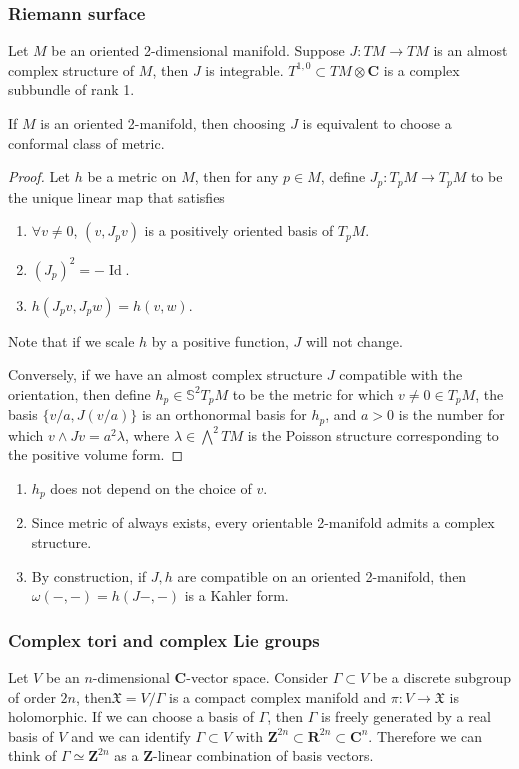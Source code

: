 \documentclass[
11pt, %
letterpaper， %
oneside, %
headinclude,footinclude, %
BCOR5mm, %
]{scrartcl}
\newcommand{\Z}{{\mathbf{Z}}}
\newcommand{\R}{{\mathbf{R}}}
\newcommand{\C}{{\mathbf{C}}}
\newcommand{\s}{{\mathbb{S}}}
\newcommand{\id}{\operatorname{Id}}
\begin{document}
\subsubsection{Riemann surface}
Let $M$ be an oriented 2-dimensional manifold. Suppose $J:TM \to TM$ is an almost complex structure of $M$, then $J$ is integrable. $T^{1,0}\subset TM\otimes \C$ is a complex subbundle of rank 1.
\begin{lem}
	If $M$ is an oriented 2-manifold, then choosing $J$ is equivalent to choose a conformal class of metric.
\end{lem}
\begin{proof}
	Let $h$ be a metric on $M$, then for any $p\in M$, define $J_p:T_pM\to T_pM$ to be the unique linear map that satisfies\begin{enumerate}
		\item $\forall v\not=0$, $(v,J_pv)$ is a positively oriented basis of $T_p M$.
		\item $(J_p)^2=-\id$.
		\item $h(J_pv,J_pw)=h(v,w)$.
	\end{enumerate}
Note that if we scale $h$ by a positive function, $J$ will not change.

Conversely, if we have an almost complex structure $J$ compatible with the orientation, then define $h_p\in \s^2T_pM$ to be the metric for which $v\not=0 \in T_pM$, the basis $\{v/a,J(v/a)\}$ is an orthonormal basis for $h_p$, and $a>0$ is the number for which $v\wedge Jv =a^2\lambda$, where $\lambda \in \bigwedge^2 TM$ is the Poisson structure corresponding to the positive volume form.
\end{proof}
\begin{rem}
	\begin{enumerate}
		\item $h_p$ does not depend on the choice of $v$.
		\item Since metric of  always exists, every orientable 2-manifold admits a complex structure.
		\item By construction, if $J, h$ are compatible on an oriented 2-manifold, then $\omega(-,-)=h(J-,-)$ is a Kahler form. 
	\end{enumerate}
\end{rem}

\subsubsection{Complex tori and complex Lie groups}
Let $V$ be an $n$-dimensional $\C$-vector space. Consider $\Gamma \subset V$ be a discrete subgroup of order $2n$, then$\mathfrak{X}=V/\Gamma$ is a compact complex manifold and $\pi: V\to \mathfrak{X}$ is holomorphic. If we can choose a basis of $\Gamma $, then $\Gamma$ is freely generated by a real basis of $V$ and we can identify $\Gamma \subset V$ with $\Z^{2n}\subset \R^{2n} \subset \C^n$. Therefore we can think of $\Gamma \simeq \Z^{2n}$ as a $\Z$-linear combination of basis vectors.
\end{document}

